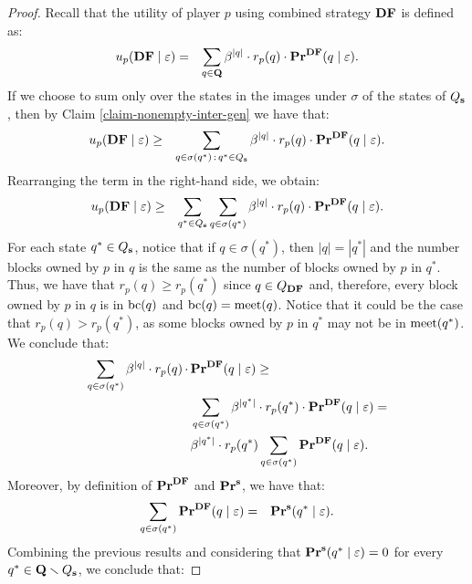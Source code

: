\begin{proof}
Recall that the utility of player $p$ using combined strategy $\text{\rm {\bf DF}}$ 
is defined as:
\begin{eqnarray*}
u_p(\text{\rm {\bf DF}} \mid \varepsilon) & = & \sum_{q \in \mathbf{Q}} \beta^{|q|} \cdot  r_p(q) \cdot \mathbf{Pr}^{\text{\rm {\bf DF}}}(q \mid \varepsilon).
\end{eqnarray*}
If we choose to sum only over the states in the images under $\sigma$ of the states of $Q_{\mathbf{s}}$, then by Claim \ref{claim-nonempty-inter-gen} we have that:
\begin{eqnarray*}
u_p(\text{\rm {\bf DF}} \mid \varepsilon) & \geq & \sum_{q \in \sigma(q^*) \,:\, q^* \in Q_{\mathbf{s}}} \beta^{|q|} \cdot  r_p(q) \cdot \mathbf{Pr}^{\text{\rm {\bf DF}}}(q \mid \varepsilon).
\end{eqnarray*}
Rearranging the term in the right-hand side, we obtain:
\begin{eqnarray*}
u_p(\text{\rm {\bf DF}} \mid \varepsilon) & \geq &\sum_{q^* \in Q_{\mathbf{s}}}   \sum_{q \in \sigma(q^*)} \beta^{|q|} \cdot  r_p(q) \cdot \mathbf{Pr}^{\text{\rm {\bf DF}}}(q \mid \varepsilon).
\end{eqnarray*}
For each state $q^* \in Q_{\mathbf{s}}$, notice that if $q \in \sigma(q^*)$, then $|q| = |q^*|$ and the number blocks owned by $p$ in $q$ is the same as the number of blocks owned by $p$ in $q^*$. Thus, we have that $r_p(q) \geq r_p(q^*)$ since $q \in Q_{\text{\rm {\bf DF}}}$ and, therefore, every block owned by $p$ in $q$ is in $\text{bc}(q)$ and $\text{bc}(q) = \text{\rm meet}(q)$.
        Notice that it could be the case that $r_p(q) > r_p(q^*)$, as some blocks owned by $p$ in $q^*$  may not be in $\text{\rm meet}(q^*)$. We conclude that:
\begin{align*}
\sum_{q \in \sigma(q^*)} \beta^{|q|} \cdot  r_p(q) \, \cdot \, & \mathbf{Pr}^{\text{\rm {\bf DF}}}(q \mid \varepsilon) \geq \\
&\sum_{q \in \sigma(q^*)} \beta^{|q^*|} \cdot  r_p(q^*) \cdot \mathbf{Pr}^{\text{\rm {\bf DF}}}(q \mid \varepsilon) = \\
&\beta^{|q^*|} \cdot  r_p(q^*) \sum_{q \in \sigma(q^*)}  \mathbf{Pr}^{\text{\rm {\bf DF}}}(q \mid \varepsilon).
\end{align*}
Moreover, by definition of $\mathbf{Pr}^{\text{\rm {\bf DF}}}$ and $\mathbf{Pr}^{\mathbf{s}}$, we have that:
\begin{eqnarray*}
\sum_{q \in \sigma(q^*)}  \mathbf{Pr}^{\text{\rm {\bf DF}}}(q \mid \varepsilon) & = & \mathbf{Pr}^{\mathbf{s}}(q^* \mid \varepsilon).
\end{eqnarray*}
Combining the previous results and considering that $\mathbf{Pr}^{\mathbf{s}}(q^* \mid \varepsilon) = 0$ for every $q^* \in \mathbf{Q} \smallsetminus Q_{\mathbf{s}}$, we conclude that: 

\end{proof}

